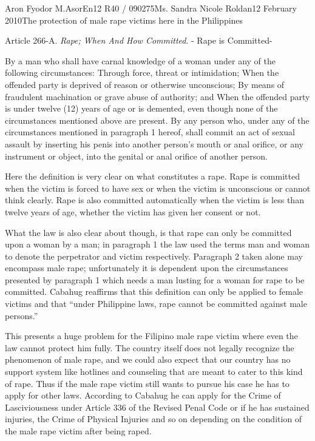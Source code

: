 \documentclass[12pt,letterpaper]{article}
\begin{document}
\begin{mla}{Aron Fyodor M.}{Asor}{En12 R40 / 090275}{Ms. Sandra Nicole Roldan}{12 February 2010}{The protection of male rape victims here in the Philippines}
\begin{mlaquote}
	Article 266-A. \textit{Rape; When And How Committed}. - Rape is Committed-
	\begin{outline}[enumerate]
			\1 By a man who shall have carnal knowledge of a woman under any of the following circumstances:
				\2 Through force, threat or intimidation;
				\2 When the offended party is deprived of reason or otherwise unconscious;
				\2 By means of fraudulent machination or grave abuse of authority; and
				\2 When the offended party is under twelve (12) years of age or is demented, even though none of the circumstances mentioned above are present.
			\1 By any person who, under any of the circumstances mentioned in paragraph 1 hereof, shall commit an act of sexual assault by inserting his penis into another person's mouth or anal orifice, or any instrument or object, into the genital or anal orifice of another person.
	\end{outline}
\end{mlaquote}

Here the definition is very clear on what constitutes a rape. Rape is committed when the victim is forced to have sex or when the victim is unconscious or cannot think clearly. Rape is also committed automatically when the victim is less than twelve years of age, whether the victim has given her consent or not.

What the law is also clear about though, is that rape can only be committed upon a woman by a man; in paragraph 1 the law used the terms man and woman to denote the perpetrator and victim respectively. Paragraph 2 taken alone may encompass male rape; unfortunately it is dependent upon the circumstances presented by paragraph 1 which needs a man lusting for a woman for rape to be committed. Cabahug reaffirms that this definition can only be applied to female victims and that ``under Philippine laws, rape cannot be committed against male persons.''

This presents a huge problem for the Filipino male rape victim where even the law cannot protect him fully. The country itself does not legally recognize the phenomenon of male rape, and we could also expect that our country has no support system like hotlines and counseling that are meant to cater to this kind of rape. Thus if the male rape victim still wants to pursue his case he has to apply for other laws. According to Cabahug he can apply for the Crime of Lasciviousness under Article 336 of the Revised Penal Code or if he has sustained injuries, the Crime of Physical Injuries and so on depending on the condition of the male rape victim after being raped.


\end{mla}
\end{document}

